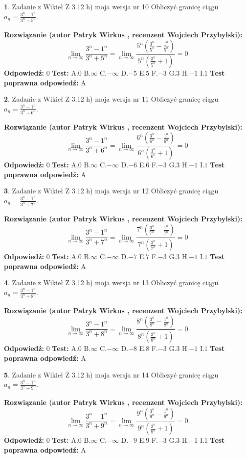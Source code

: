 \documentclass[12pt, a4paper]{article}
\theoremstyle{definition} %
\newtheorem{zad}{}
\newcommand{\zadStart}[1]{\begin{zad}#1\newline}
\newcommand{\zadStop}{\end{zad}}
\newcommand{\rozwStart}[2]{\noindent \textbf{Rozwiązanie (autor #1 , recenzent #2): }\newline}
\newcommand{\rozwStop}{\newline}
\newcommand{\odpStart}{\noindent \textbf{Odpowiedź:}\newline}
\newcommand{\odpStop}{\newline}
\newcommand{\testStart}{\noindent \textbf{Test:}\newline}
\newcommand{\testStop}{\newline}
\newcommand{\kluczStart}{\noindent \textbf{Test poprawna odpowiedź:}\newline}
\newcommand{\kluczStop}{\newline}
\begin{document}
\zadStart{Zadanie z Wikieł Z 3.12 h) moja wersja nr 10}
Obliczyć granicę ciągu $a_{n}=\frac{3^{n} - 1^{n}}{3^{n} + 5^{n}}$.
\zadStop
\rozwStart{Patryk Wirkus}{Wojciech Przybylski}
$$\lim\limits_{n\to\infty}\frac{3^{n} - 1^{n}}{3^{n} + 5^{n}} = \lim\limits_{n\to\infty}\frac{5^{n}(\frac{3^{n}}{5^{n}} - \frac{1^{n}}{5^{n}})}{5^{n}(\frac{3^{n}}{5^{n}} + 1)} = 0$$
\rozwStop
\odpStart
$0$
\odpStop
\testStart
A.$0$
B.$\infty$
C.$-\infty$
D.$-5$
E.$5$
F.$-3$
G.$3$
H.$-1$
I.$1$
\testStop
\kluczStart
A
\kluczStop



\zadStart{Zadanie z Wikieł Z 3.12 h) moja wersja nr 11}
Obliczyć granicę ciągu $a_{n}=\frac{3^{n} - 1^{n}}{3^{n} + 6^{n}}$.
\zadStop
\rozwStart{Patryk Wirkus}{Wojciech Przybylski}
$$\lim\limits_{n\to\infty}\frac{3^{n} - 1^{n}}{3^{n} + 6^{n}} = \lim\limits_{n\to\infty}\frac{6^{n}(\frac{3^{n}}{6^{n}} - \frac{1^{n}}{6^{n}})}{6^{n}(\frac{3^{n}}{6^{n}} + 1)} = 0$$
\rozwStop
\odpStart
$0$
\odpStop
\testStart
A.$0$
B.$\infty$
C.$-\infty$
D.$-6$
E.$6$
F.$-3$
G.$3$
H.$-1$
I.$1$
\testStop
\kluczStart
A
\kluczStop



\zadStart{Zadanie z Wikieł Z 3.12 h) moja wersja nr 12}
Obliczyć granicę ciągu $a_{n}=\frac{3^{n} - 1^{n}}{3^{n} + 7^{n}}$.
\zadStop
\rozwStart{Patryk Wirkus}{Wojciech Przybylski}
$$\lim\limits_{n\to\infty}\frac{3^{n} - 1^{n}}{3^{n} + 7^{n}} = \lim\limits_{n\to\infty}\frac{7^{n}(\frac{3^{n}}{7^{n}} - \frac{1^{n}}{7^{n}})}{7^{n}(\frac{3^{n}}{7^{n}} + 1)} = 0$$
\rozwStop
\odpStart
$0$
\odpStop
\testStart
A.$0$
B.$\infty$
C.$-\infty$
D.$-7$
E.$7$
F.$-3$
G.$3$
H.$-1$
I.$1$
\testStop
\kluczStart
A
\kluczStop



\zadStart{Zadanie z Wikieł Z 3.12 h) moja wersja nr 13}
Obliczyć granicę ciągu $a_{n}=\frac{3^{n} - 1^{n}}{3^{n} + 8^{n}}$.
\zadStop
\rozwStart{Patryk Wirkus}{Wojciech Przybylski}
$$\lim\limits_{n\to\infty}\frac{3^{n} - 1^{n}}{3^{n} + 8^{n}} = \lim\limits_{n\to\infty}\frac{8^{n}(\frac{3^{n}}{8^{n}} - \frac{1^{n}}{8^{n}})}{8^{n}(\frac{3^{n}}{8^{n}} + 1)} = 0$$
\rozwStop
\odpStart
$0$
\odpStop
\testStart
A.$0$
B.$\infty$
C.$-\infty$
D.$-8$
E.$8$
F.$-3$
G.$3$
H.$-1$
I.$1$
\testStop
\kluczStart
A
\kluczStop



\zadStart{Zadanie z Wikieł Z 3.12 h) moja wersja nr 14}
Obliczyć granicę ciągu $a_{n}=\frac{3^{n} - 1^{n}}{3^{n} + 9^{n}}$.
\zadStop
\rozwStart{Patryk Wirkus}{Wojciech Przybylski}
$$\lim\limits_{n\to\infty}\frac{3^{n} - 1^{n}}{3^{n} + 9^{n}} = \lim\limits_{n\to\infty}\frac{9^{n}(\frac{3^{n}}{9^{n}} - \frac{1^{n}}{9^{n}})}{9^{n}(\frac{3^{n}}{9^{n}} + 1)} = 0$$
\rozwStop
\odpStart
$0$
\odpStop
\testStart
A.$0$
B.$\infty$
C.$-\infty$
D.$-9$
E.$9$
F.$-3$
G.$3$
H.$-1$
I.$1$
\testStop
\kluczStart
A
\kluczStop
\end{document}
